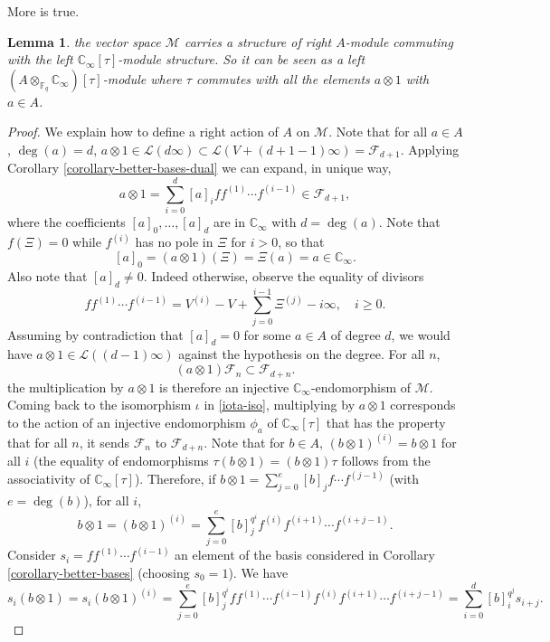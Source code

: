 \documentclass[11pt]{amsart}
\numberwithin{equation}{section}
\newcommand{\FF}{\mathbb{F}}
\newcommand{\CC}{\mathbb{C}}
\newtheorem{Lemma}[Theorem]{Lemma}
\begin{document}
More is true.

\begin{Lemma}\label{anderson-motives}
the vector space $\mathcal{M}$ carries a structure of right $A$-module commuting with the left $\CC_\infty[\tau]$-module structure.
So it can be seen as a left $(A\otimes_{\FF_q}\CC_\infty)[\tau]$-module where $\tau$ commutes with all the elements $a\otimes1$ with $a\in A$.
\end{Lemma}

\begin{proof}
We explain how to define a right action of $A$ on $\mathcal{M}$. Note that for all $a\in A$, $\deg(a)=d$,
$a\otimes1\in\mathcal{L}(d\infty)\subset\mathcal{L}(V+(d+1-1)\infty)=\mathcal{F}_{d+1}$.
Applying Corollary \ref{corollary-better-bases-dual} we can expand, in unique way,
\begin{equation}\label{decomposition-a}
a\otimes1=\sum_{i=0}^{d}[a]_iff^{(1)}\cdots f^{(i-1)}\in\mathcal{F}_{d+1},
\end{equation}
where the coefficients $[a]_0,\ldots,[a]_d$ are in $\CC_\infty$ with $d=\deg(a)$. Note that $f(\Xi)=0$ while $f^{(i)}$ has no pole in $\Xi$ for $i>0$, so that
$$[a]_0=(a\otimes1)(\Xi)=\Xi(a)=a\in\CC_\infty.$$ Also note that $[a]_d\neq0$. Indeed otherwise, observe the equality of divisors
\begin{equation}\label{interated-shtuka}
ff^{(1)}\cdots f^{(i-1)}=V^{(i)}-V+\sum_{j=0}^{i-1}\Xi^{(j)}-i\infty,\quad i\geq0.
\end{equation}
Assuming by contradiction that $[a]_d=0$ for some $a\in A$ of degree $d$, we would have $a\otimes1\in\mathcal{L}((d-1)\infty)$ against the hypothesis on the degree.
For all $n$,
$$(a\otimes1)\mathcal{F}_{n}\subset\mathcal{F}_{d+n}.$$ the multiplication by $a\otimes1$ is therefore an injective 
$\CC_\infty$-endomorphism of $\mathcal{M}$. Coming back to the isomorphism $\iota$ in \eqref{iota-iso}, multiplying by $a\otimes1$ corresponds to the action of an injective endomorphism $\phi_a$ of $\CC_\infty[\tau]$ that has the property that 
for all $n$, it sends $\mathcal{F}_n$ to $\mathcal{F}_{d+n}$. 
Note that for $b\in A$, $(b\otimes1)^{(i)}=b\otimes1$ for all $i$ (the equality of endomorphisms $\tau(b\otimes1)=(b\otimes1)\tau$ follows from the associativity of $\CC_\infty[\tau]$). Therefore, if $b\otimes1=\sum_{j=0}^e[b]_jf\cdots f^{(j-1)}$ (with $e=\deg(b)$), for all $i$,
$$b\otimes1=(b\otimes1)^{(i)}=\sum_{j=0}^{e}[b]_j^{q^i}f^{(i)}f^{(i+1)}\cdots f^{(i+j-1)}.$$ 
Consider $s_i=ff^{(1)}\cdots f^{(i-1)}$ an element of the basis considered in Corollary \ref{corollary-better-bases} (choosing $s_0=1$). 
We have 
\begin{equation}\label{si}
s_i(b\otimes1)=s_i(b\otimes1)^{(i)}=\sum_{j=0}^{e}[b]_j^{q^i}ff^{(1)}\cdots f^{(i-1)}f^{(i)}f^{(i+1)}\cdots f^{(i+j-1)}
=\sum_{i=0}^{d}[b]_i^{q^j}s_{i+j}.\end{equation}


\end{proof}
\end{document}
